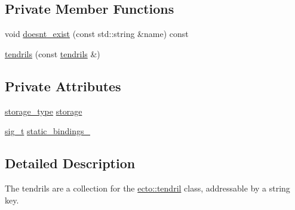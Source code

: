 \subsection*{Private Member Functions}
\begin{DoxyCompactItemize}
\item 
void \hyperlink{classecto_1_1tendrils_aa33d16327157994060a8051d2bbe018e}{doesnt\-\_\-exist} (const std\-::string \&name) const 
\item 
\hyperlink{classecto_1_1tendrils_a7ee52bb996bd2ec581ff2008dea341dc}{tendrils} (const \hyperlink{classecto_1_1tendrils}{tendrils} \&)
\end{DoxyCompactItemize}
\subsection*{Private Attributes}
\begin{DoxyCompactItemize}
\item 
\hyperlink{classecto_1_1tendrils_a3647503829f1b29de220584d265c63fb}{storage\-\_\-type} \hyperlink{classecto_1_1tendrils_afaa587298937ffa94ccfefc8a97b4edc}{storage}
\item 
\hyperlink{classecto_1_1tendrils_aca7990b4d8ccfbddfb4d5c805345ca23}{sig\-\_\-t} \hyperlink{classecto_1_1tendrils_a40635d009ae082dccde9486c1293212e}{static\-\_\-bindings\-\_\-}
\end{DoxyCompactItemize}


\subsection{Detailed Description}
The tendrils are a collection for the \hyperlink{classecto_1_1tendril}{ecto\-::tendril} class, addressable by a string key. 


